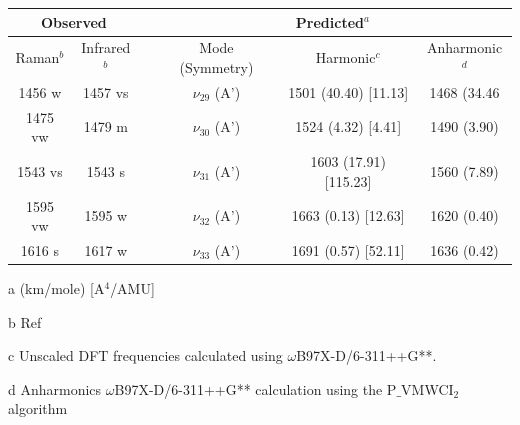\begin{table}[H]
	\begin{center}
		\begin{threeparttable}
			\begin{tabular}{c c c c c c}
				\hline
				\multicolumn{ 2}{c}{Observed} & \multicolumn{1}{c}{} & \multicolumn{ 3}{c}{Predicted$^{a}$} \\ \hline
				Raman$^{b}$ & \multicolumn{1}{c}{Infrared$^{b}$} &  & \multicolumn{1}{c}{Mode (Symmetry)} & \multicolumn{1}{c}{Harmonic$^{c}$} & Anharmonic$^{d}$ \\ \hline
 1456 w & 1457 vs &  & $\nu_{29}$ (A’) & 1501 (40.40) [11.13] &  1468 (34.46 \\ 
 1475 vw & 1479 m &  & $\nu_{30}$ (A’) & 1524 (4.32) [4.41] & 
 1490 (3.90) \\ 
 1543 vs & 1543 s &  & $\nu_{31}$ (A’)&1603 (17.91) [115.23] & 1560 (7.89) \\ 
 1595 vw & 1595 w & \multicolumn{1}{c}{} & $\nu_{32}$ (A’)
 & 1663 (0.13) [12.63] & 1620 (0.40) \\ 
 1616 s & 1617 w & \multicolumn{1}{c}{} & $\nu_{33}$ (A’) & 1691 (0.57) [52.11]& 1636 (0.42)\\
 \hline
\end{tabular}

\begin{tablenotes}
	\item[a] (km/mole) [A$^{4}$/AMU]
	\item[b] Ref \cite{singh2006ab}
	\item[c] Unscaled DFT frequencies calculated using $\omega$B97X-D/6-311++G**.
	\item[d] Anharmonics $\omega$B97X-D/6-311++G** calculation using the P$\_$VMWCI$_{2}$ algorithm
\end{tablenotes}
\end{threeparttable}
\end{center}
\label{freq-Benzofuran}
\end{table}



